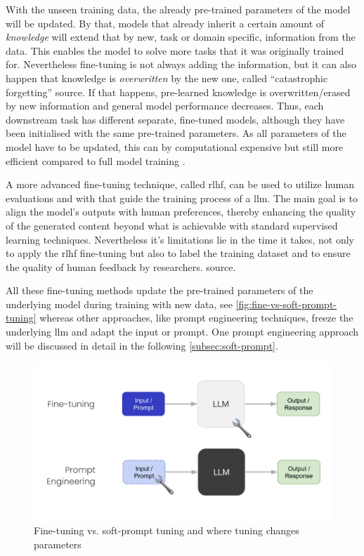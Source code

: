 With the unseen training data, the already pre-trained parameters of the model will be updated. By that, models that already inherit a certain amount of \textit{knowledge} will extend that by new, task or domain specific, information from the data. This enables the model to solve more tasks that it was originally trained for. Nevertheless fine-tuning is not always adding the information, but it can also happen that knowledge is \textit{overwritten} by the new one, called \enquote{catastrophic forgetting} \textcolor{bhtRed}{source}. If that happens, pre-learned knowledge is overwritten/erased by new information and general model performance decreases. Thus, each downstream task has different separate, fine-tuned models, although they have been initialised with the same pre-trained parameters. As all parameters of the model have to be updated, this can by computational expensive but still more efficient compared to full model training \citep{fine-tuning}.

A more advanced fine-tuning technique, called \acrfull{rlhf}, can be used to utilize human evaluations and with that guide the training process of a \acrshort{llm}. The main goal is to align the model's outputs with human preferences, thereby enhancing the quality of the generated content beyond what is achievable with standard supervised learning techniques. Nevertheless it's limitations lie in the time it takes, not only to apply the \acrshort{rlhf} fine-tuning but also to label the training dataset and to ensure the quality of human feedback by researchers.  \textcolor{bhtRed}{source}.

All these fine-tuning methods update the pre-trained parameters of the underlying model during training with new data, see \autoref{fig:fine-vs-soft-prompt-tuning} whereas other approaches, like prompt engineering techniques, freeze the underlying \acrshort{llm} and adapt the input or prompt. One prompt engineering approach will be discussed in detail in the following \autoref{subsec:soft-prompt}. 

\begin{figure}[h]
    \centering
    \includegraphics[width=\textwidth]{bhtThesis/main/2Background/images/prompt-vs-fine-tuning.png}
    \caption{Fine-tuning vs. soft-prompt tuning and where tuning changes parameters}
    \label{fig:fine-vs-soft-prompt-tuning}
\end{figure}


